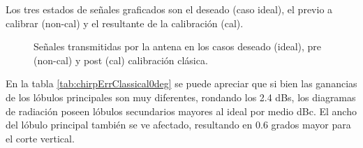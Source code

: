 Los tres estados de señales graficados son el deseado (caso ideal), el previo a calibrar (non-cal) y el resultante de la
calibración (cal).
\begin{figure}[H]
	\centering

	\caption{Señales transmitidas por la antena en los casos deseado (ideal), pre (non-cal) y post (cal) calibración clásica.}
	\label{fig:chirpErrClassical0deg}
\end{figure}

En la tabla \ref{tab:chirpErrClassical0deg} se puede apreciar que si bien las ganancias de los lóbulos principales son muy 
diferentes, rondando los 2.4 dBs, los diagramas de radiación poseen lóbulos secundarios mayores al ideal por medio dBc. El 
ancho del lóbulo principal también se ve afectado, resultando en 0.6 grados mayor para el corte vertical.

